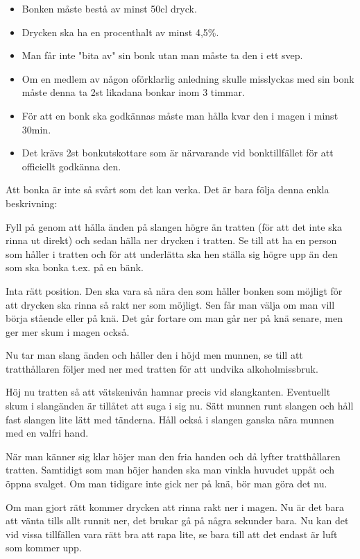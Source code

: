 \begin{itemize}
    \item Bonken måste bestå av minst 50cl dryck.
    \item Drycken ska ha en procenthalt av minst 4,5\%.
    \item Man får inte "bita av" sin bonk utan man måste ta den i ett svep.
    \item Om en medlem av någon oförklarlig anledning skulle misslyckas med sin bonk måste denna ta 2st likadana bonkar inom 3 timmar.
    \item För att en bonk ska godkännas måste man hålla kvar den i magen i minst 30min.
    \item Det krävs 2st bonkutskottare som är närvarande vid bonktillfället för att officiellt godkänna den.
\end{itemize}\newpage


Att bonka är inte så svårt som det kan verka. Det är bara följa denna enkla beskrivning:

Fyll på genom att hålla änden på slangen högre än tratten (för att det inte ska rinna ut direkt) och sedan hälla ner drycken i tratten. Se till att ha en person som håller i tratten och för att underlätta ska hen ställa sig högre upp än den som ska bonka t.ex. på en bänk.

Inta rätt position. Den ska vara så nära den som håller bonken som möjligt för att drycken ska rinna så rakt ner som möjligt. Sen får man välja om man vill börja stående eller på knä. Det går fortare om man går ner på knä senare, men ger mer skum i magen också.

Nu tar man slang änden och håller den i höjd men munnen, se till att tratthållaren följer med ner med tratten för att undvika alkoholmissbruk.

Höj nu tratten så att vätskenivån hamnar precis vid slangkanten. Eventuellt skum i slangänden är tillåtet att suga i sig nu. Sätt munnen runt slangen och håll fast slangen lite lätt med tänderna. Håll också i slangen ganska nära munnen med en valfri hand.

När man känner sig klar höjer man den fria handen och då lyfter tratthållaren tratten. Samtidigt som man höjer handen ska man vinkla huvudet uppåt och öppna svalget. Om man tidigare inte gick ner på knä, bör man göra det nu.

Om man gjort rätt kommer drycken att rinna rakt ner i magen. Nu är det bara att vänta tills allt runnit ner, det brukar gå på några sekunder bara. Nu kan det vid vissa tillfällen vara rätt bra att rapa lite, se bara till att det endast är luft som kommer upp.

